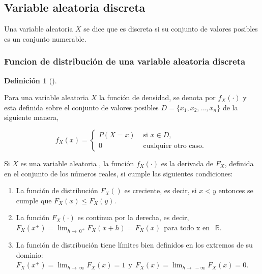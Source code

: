 \documentclass[
  us-letterpaper,
]{scrreprt}
\theoremstyle{plain}
\theoremstyle{definition}
\newtheorem{definition}{Definición}[chapter]
\theoremstyle{definition}
\theoremstyle{remark}
\begin{document}
\subsection{Variable aleatoria discreta}\label{sec-VAD}

Una variable aleatoria \(X\) se dice que es discreta si su conjunto de
valores posibles es un conjunto numerable.

\subsubsection{Funcion de distribución de una variable aleatoria
discreta}\label{funcion-de-distribuciuxf3n-de-una-variable-aleatoria-discreta}

\begin{definition}[]\protect\hypertarget{def-fdd}{}\label{def-fdd}

Para una variable aleatoria \(X\) la función de densidad, se denota por
\(f_X(\cdot)\) y esta definida sobre el conjunto de valores posibles
\(D =\{x_1,x_2,\dots,x_n\}\) de la siguiente manera,

\[
f_X(x)= \begin{cases}P(X=x) & \text{ si } x \in D ,\\ 
          0 & \text{ cualquier otro caso. }\end{cases} 
\]

Si \(X\) es una variable aleatoria , la función \(f_X (\cdot)\) es la
derivada de \(F_X\), definida en el conjunto de los números reales, si
cumple las siguientes condiciones:

\begin{enumerate}
\def\labelenumi{\arabic{enumi}.}
\item
  La función de distribución \(F_X()\) es creciente, es decir, si
  \(x<y\) entonces se cumple que \(F_X (x) \leq F_X (y).\)
\item
  La función \(F_X (\cdot)\) es continua por la derecha, es decir,
  \(F_X(x^+) = \lim_{h \to \ 0^+} F_X ( x + h) = F_X ( x )  \ \ \text{para todo x en }  \ \ \mathbb{R}.\)
\item
  La función de distribución tiene límites bien definidos en los
  extremos de su dominio:
  \(F_X(x^+) = \lim_{h \to \ \infty} F_X ( x ) = 1 \ \ \text{y} \  \  F_X(x) = \lim_{h \to \ -\infty} F_X ( x ) = 0.\)
\end{enumerate}

\end{definition}
\end{document}
